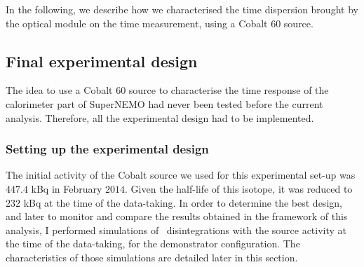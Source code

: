 In the following, we describe how we characterised the time dispersion brought by the optical module on the time measurement, using a Cobalt 60 source.


\subsection{Final experimental design}
\label{subsec:Co_setup}


The idea to use a Cobalt $60$ source to characterise the time response of the calorimeter part of SuperNEMO had never been tested before the current analysis.
Therefore, all the experimental design had to be implemented.


\subsubsection*{Setting up the experimental design}


The initial activity of the Cobalt source we used for this experimental set-up was $447.4$ kBq in February $2014$.
Given the half-life of this isotope, it was reduced to $232$ kBq at the time of the data-taking.
In order to determine the best design, and later to monitor and compare the results obtained in the framework of this analysis, I performed simulations of \Co\ disintegrations with the source activity at the time of the data-taking, for the demonstrator configuration.
The characteristics of those simulations are detailed later in this section.

